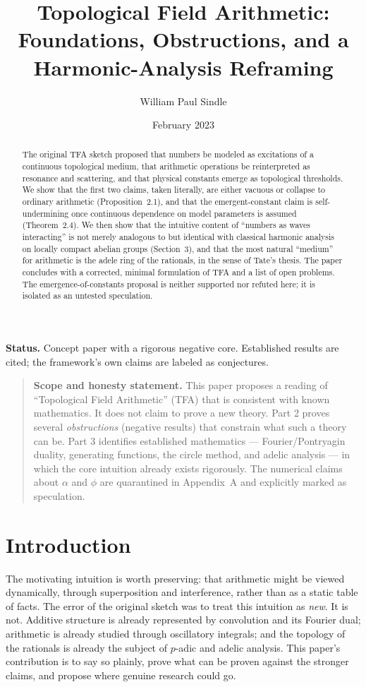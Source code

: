 \documentclass[11pt]{article}
\title{\bfseries Topological Field Arithmetic:\\ Foundations, Obstructions, and a Harmonic-Analysis Reframing}
\author{William Paul Sindle}
\date{February 2023}
\begin{document}
\maketitle

\noindent\textbf{Status.} Concept paper with a rigorous negative core. Established
results are cited; the framework's own claims are labeled as conjectures.

\begin{quote}
\noindent\textbf{Scope and honesty statement.} This paper proposes a reading of
``Topological Field Arithmetic'' (TFA) that is consistent with known mathematics.
It does not claim to prove a new theory. Part 2 proves several \emph{obstructions}
(negative results) that constrain what such a theory can be. Part 3 identifies
established mathematics --- Fourier/Pontryagin duality, generating functions, the
circle method, and adelic analysis --- in which the core intuition already exists
rigorously. The numerical claims about $\alpha$ and $\phi$ are quarantined in
Appendix~A and explicitly marked as speculation.
\end{quote}

\begin{abstract}
\noindent The original TFA sketch proposed that numbers be modeled as excitations
of a continuous topological medium, that arithmetic operations be reinterpreted as
resonance and scattering, and that physical constants emerge as topological
thresholds. We show that the first two claims, taken literally, are either vacuous
or collapse to ordinary arithmetic (Proposition~2.1), and that the
emergent-constant claim is self-undermining once continuous dependence on model
parameters is assumed (Theorem~2.4). We then show that the intuitive content of
``numbers as waves interacting'' is not merely analogous to but identical with
classical harmonic analysis on locally compact abelian groups (Section~3), and
that the most natural ``medium'' for arithmetic is the adele ring of the
rationals, in the sense of Tate's thesis. The paper concludes with a corrected,
minimal formulation of TFA and a list of open problems. The emergence-of-constants
proposal is neither supported nor refuted here; it is isolated as an untested
speculation.
\end{abstract}

\section{Introduction}

The motivating intuition is worth preserving: that arithmetic might be viewed
dynamically, through superposition and interference, rather than as a static table
of facts. The error of the original sketch was to treat this intuition as
\emph{new}. It is not. Additive structure is already represented by convolution
and its Fourier dual; arithmetic is already studied through oscillatory integrals;
and the topology of the rationals is already the subject of $p$-adic and adelic
analysis. This paper's contribution is to say so plainly, prove what can be proven
against the stronger claims, and propose where genuine research could go.
\end{document}
